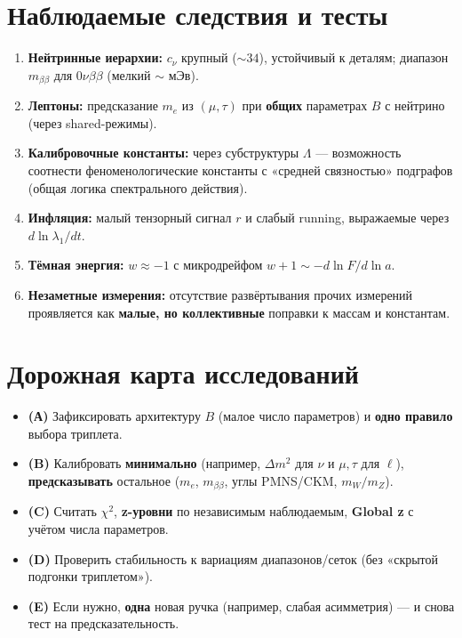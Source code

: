 \documentclass[12pt,a4paper]{article}
\begin{document}
\section{Наблюдаемые следствия и тесты}

\begin{enumerate}
    \item \textbf{Нейтринные иерархии:} \(c_\nu\) крупный (\(\sim 34\)), устойчивый к деталям; диапазон \(m_{\beta\beta}\) для \(0\nu\beta\beta\) (мелкий \(\sim\) мЭв).
    \item \textbf{Лептоны:} предсказание \(m_e\) из \((\mu, \tau)\) при \textbf{общих} параметрах \(B\) с нейтрино (через shared-режимы).
    \item \textbf{Калибровочные константы:} через субструктуры \(\Lambda\) — возможность соотнести феноменологические константы с «средней связностью» подграфов (общая логика спектрального действия).
    \item \textbf{Инфляция:} малый тензорный сигнал \(r\) и слабый running, выражаемые через \(d \ln \lambda_1 / dt\).
    \item \textbf{Тёмная энергия:} \(w \approx -1\) с микродрейфом \(w + 1 \sim -d \ln F / d \ln a\).
    \item \textbf{Незаметные измерения:} отсутствие развёртывания прочих измерений проявляется как \textbf{малые, но коллективные} поправки к массам и константам.
\end{enumerate}

\section{Дорожная карта исследований}

\begin{itemize}
    \item \textbf{(А)} Зафиксировать архитектуру \(B\) (малое число параметров) и \textbf{одно правило} выбора триплета.
    \item \textbf{(B)} Калибровать \textbf{минимально} (например, \(\Delta m^2\) для \(\nu\) и \(\mu, \tau\) для \(\ell\)), \textbf{предсказывать} остальное (\(m_e\), \(m_{\beta\beta}\), углы PMNS/CKM, \(m_W/m_Z\)).
    \item \textbf{(C)} Считать \(\chi^2\), \textbf{z-уровни} по независимым наблюдаемым, \textbf{Global z} с учётом числа параметров.
    \item \textbf{(D)} Проверить стабильность к вариациям диапазонов/сеток (без «скрытой подгонки триплетом»).
    \item \textbf{(E)} Если нужно, \textbf{одна} новая ручка (например, слабая асимметрия) — и снова тест на предсказательность.
\end{itemize}
\end{document}
